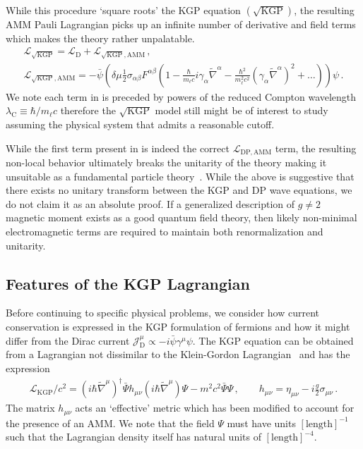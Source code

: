 While this procedure `square roots' the KGP equation $(\mathrm{\sqrt{KGP}})$, the resulting AMM Pauli Lagrangian  picks up an infinite number of derivative and field terms which makes the theory rather unpalatable.
\begin{gather}
    \label{lamm:2}
    \mathcal{L}_{\sqrt{\mathrm{KGP}}} = \mathcal{L}_\mathrm{D}+\mathcal{L}_\mathrm{\sqrt{KGP},AMM}\,,\\
    \label{lamm:3}
    \mathcal{L}_\mathrm{\sqrt{KGP},AMM} = -{\bar\psi}\left(\delta\mu\frac{1}{2}\sigma_{\alpha\beta}F^{\alpha\beta}\left(1 - \frac{\hbar}{m_{\ell}c}i\gamma_{\alpha}\widetilde\nabla^{\alpha} - \frac{\hbar^{2}}{m_{\ell}^{2}c^{2}}\left(\gamma_{\alpha}\widetilde\nabla^{\alpha}\right)^{2} + \ldots\right)\right)\psi\,.
\end{gather}
We note each term in  is preceded by powers of the reduced Compton wavelength $\lambda_\mathrm{C}\!\equiv\!\hbar/m_{\ell}c$ therefore the $\sqrt{\mathrm{KGP}}$ model still might be of interest to study assuming the physical system that admits a reasonable cutoff.

While the first term present in  is indeed the correct $\mathcal{L}_\mathrm{DP,AMM}$ term, the resulting non-local behavior ultimately breaks the unitarity of the theory making it unsuitable as a fundamental particle theory~\citep{Veltman:1997am}. While the above is suggestive that there exists no unitary transform between the KGP and DP wave equations, we do not claim it as an absolute proof. If a generalized description of $g\!\neq\!2$ magnetic moment exists as a good quantum field theory, then likely non-minimal electromagnetic terms are required to maintain both renormalization and unitarity.

\subsection{Features of the KGP Lagrangian}
\label{sec:lagrangian}
\noindent Before continuing to specific physical problems, we consider how current conservation is expressed in the KGP formulation of fermions and how it might differ from the Dirac current $\mathcal{J}_\mathrm{D}^{\mu}\propto-i\bar\psi\gamma^{\mu}\psi$. The KGP equation can be obtained from a Lagrangian not dissimilar to the Klein-Gordon Lagrangian~\citep{Delgado-Acosta:2010ita,DelgadoAcosta:2015ikk,Espin:2015bja} and has the expression
\begin{gather}
\label{lagrangian:1} \mathcal{L}_\mathrm{KGP}/c^{2}=\left(i\hbar{\widetilde\nabla}^{\mu}\right)^{\dag}\bar{\Psi}h_{\mu\nu}\left(i\hbar{\widetilde\nabla}^{\mu}\right)\Psi-m^{2}c^{2}\bar{\Psi}\Psi\,,\qquad h_{\mu\nu}=\eta_{\mu\nu}-i\frac{g}{2}\sigma_{\mu\nu}\,.
\end{gather}
The matrix $h_{\mu\nu}$ acts an `effective' metric which has been modified to account for the presence of an AMM. We note that the field $\Psi$ must have units $[\mathrm{length}]^{-1}$ such that the Lagrangian density itself has natural units of $[\mathrm{length}]^{-4}$.

